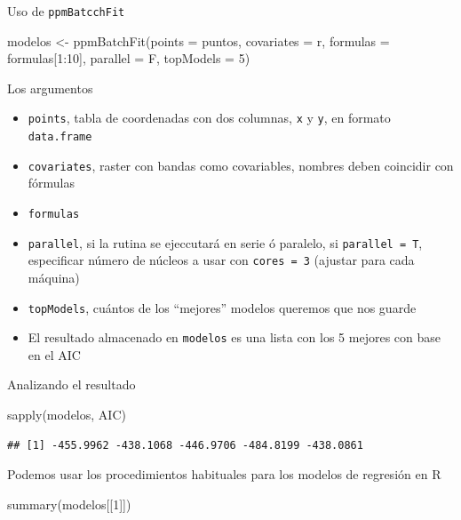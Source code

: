 \documentclass[
  11pt,
  ignorenonframetext,
]{beamer}
\newenvironment{Shaded}{}{}
\newcommand{\AttributeTok}[1]{\textcolor[rgb]{0.49,0.56,0.16}{#1}}
\newcommand{\DecValTok}[1]{\textcolor[rgb]{0.25,0.63,0.44}{#1}}
\newcommand{\FunctionTok}[1]{\textcolor[rgb]{0.02,0.16,0.49}{#1}}
\newcommand{\NormalTok}[1]{#1}
\newcommand{\OtherTok}[1]{\textcolor[rgb]{0.00,0.44,0.13}{#1}}
\newcommand{\SpecialCharTok}[1]{\textcolor[rgb]{0.25,0.44,0.63}{#1}}
\begin{document}
\begin{frame}[fragile]{Uso de \texttt{ppmBatcchFit}}
\protect\hypertarget{uso-de-ppmbatcchfit}{}
\begin{Shaded}
\begin{Highlighting}[]
\NormalTok{modelos }\OtherTok{\textless{}{-}} \FunctionTok{ppmBatchFit}\NormalTok{(}\AttributeTok{points =}\NormalTok{ puntos,}
                       \AttributeTok{covariates =}\NormalTok{ r, }
                       \AttributeTok{formulas =}\NormalTok{ formulas[}\DecValTok{1}\SpecialCharTok{:}\DecValTok{10}\NormalTok{],}
                       \AttributeTok{parallel =}\NormalTok{ F,}
                       \AttributeTok{topModels =} \DecValTok{5}\NormalTok{)}
\end{Highlighting}
\end{Shaded}
\end{frame}

\begin{frame}[fragile]{Los argumentos}
\protect\hypertarget{los-argumentos}{}
\begin{itemize}
\item
  \texttt{points}, tabla de coordenadas con dos columnas, \texttt{x} y
  \texttt{y}, en formato \texttt{data.frame}
\item
  \texttt{covariates}, raster con bandas como covariables, nombres deben
  coincidir con fórmulas
\item
  \texttt{formulas}
\item
  \texttt{parallel}, si la rutina se ejeccutará en serie ó paralelo, si
  \texttt{parallel\ =\ T}, especificar número de núcleos a usar con
  \texttt{cores\ =\ 3} (ajustar para cada máquina)
\item
  \texttt{topModels}, cuántos de los ``mejores'' modelos queremos que
  nos guarde
\item
  El resultado almacenado en \texttt{modelos} es una lista con los 5
  mejores con base en el AIC
\end{itemize}
\end{frame}

\begin{frame}[fragile]{Analizando el resultado}
\protect\hypertarget{analizando-el-resultado}{}
\begin{Shaded}
\begin{Highlighting}[]
\FunctionTok{sapply}\NormalTok{(modelos, AIC)}
\end{Highlighting}
\end{Shaded}

\begin{verbatim}
## [1] -455.9962 -438.1068 -446.9706 -484.8199 -438.0861
\end{verbatim}

Podemos usar los procedimientos habituales para los modelos de regresión
en R

\begin{Shaded}
\begin{Highlighting}[]
\FunctionTok{summary}\NormalTok{(modelos[[}\DecValTok{1}\NormalTok{]])}
\end{Highlighting}
\end{Shaded}
\end{frame}
\end{document}
